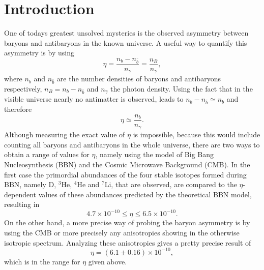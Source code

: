 \chapter{Introduction}
One of todays greatest unsolved mysteries is the observed asymmetry between baryons and antibaryons in the known universe. A useful way to quantify this asymmetry is by using
\begin{equation}
	\eta=\frac{n_b-n_{\bar{b}}}{n_\gamma}=\frac{n_B}{n_\gamma},
	\label{eq:asymmetry}
\end{equation}
where $n_b$ and $n_{\bar{b}}$ are the number densities of baryons and antibaryons respectively, $n_B=n_b-n_{\bar{b}}$ and $n_\gamma$ the photon density. Using the fact that in the visible universe nearly no antimatter is observed, leads to $n_b-n_{\bar{b}}\simeq n_b$ and therefore
\begin{equation}
\eta\simeq\frac{n_b}{n_\gamma}.
\end{equation}\newline \indent
Although measuring the exact value of $\eta$ is impossible, because this would include counting all baryons and antibaryons in the whole universe, there are two ways to obtain a range of values for $\eta$, namely using the model of Big Bang Nucleosynthesis (BBN) and the Cosmic Microwave Background (CMB)\cite{Sarkar:2002er}. In the first case the primordial abundances of the four stable isotopes formed during BBN, namely D, $^3$He, $^4$He and $^7$Li, that are observed, are compared to the $\eta$-dependent values of these abundances predicted by the theoretical BBN model, resulting in 
\cite[Eq. (1.25)]{Biondini:2016hhn}
\begin{equation}
	4.7\times10^{-10}\leq\eta\leq6.5\times10^{-10}.
\end{equation}
On the other hand, a more precise way of probing the baryon asymmetry is by using the CMB or more precisely any anisotropies showing in the otherwise isotropic spectrum. Analyzing these anisotropies gives a pretty precise result of \cite[Eq. (1.26)]{Biondini:2016hhn}
\begin{equation}
\eta=(6.1\pm0.16)\times10^{-10},
\label{eq:eta_value}
\end{equation}
which is in the range for $\eta$ given above.\newline \indent
